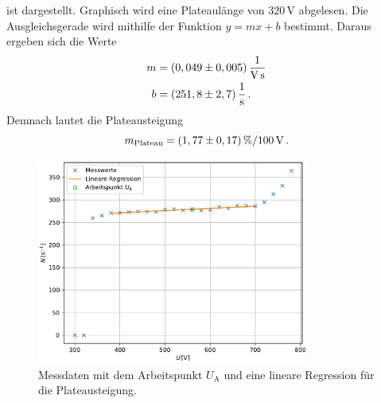 ist dargestellt. Graphisch wird eine Plateaulänge von $320\,\unit{\volt}$ abgelesen. Die Ausgleichsgerade wird mithilfe der Funktion $y = mx+b$ bestimmt. Daraus ergeben sich die Werte
\begin{align*}
  m &= (0,049\pm0,005)\,\unit[per-mode=fraction]{\per\volt\per\second}\\
  b &= (251,8\pm2,7)\,\unit[per-mode=fraction]{\per\second}\,.
\end{align*}
Demnach lautet die Plateausteigung 
$$m_{\text{Plateau}} = (1,77\pm0,17)\,\unit[per-mode=fraction]{\percent\per100\,\volt}\,.$$
\begin{figure}[H]
  \centering
  \includegraphics[width=0.8\textwidth]{Kennlinie.pdf}
  \caption{Messdaten mit dem Arbeitspunkt $U_{\text{A}}$ und eine lineare Regression für die Plateausteigung.}
  \label{fig:Kennlinie_Plot}
\end{figure}

